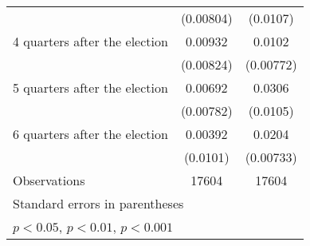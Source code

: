 \begin{table}[htbp]
\begin{tabular}{l*{2}{c}}
                    &   (0.00804)         &    (0.0107)         \\
[1em]
 4 quarters after the election&     0.00932         &      0.0102         \\
                    &   (0.00824)         &   (0.00772)         \\
[1em]
 5 quarters after the election&     0.00692         &      0.0306\sym{**} \\
                    &   (0.00782)         &    (0.0105)         \\
[1em]
 6 quarters after the election&     0.00392         &      0.0204\sym{**} \\
                    &    (0.0101)         &   (0.00733)         \\
\hline
Observations        &       17604         &       17604         \\
\hline\hline
\multicolumn{3}{l}{\footnotesize Standard errors in parentheses}\\
\multicolumn{3}{l}{\footnotesize \sym{*} \(p<0.05\), \sym{**} \(p<0.01\), \sym{***} \(p<0.001\)}\\
\end{tabular}
\end{table}
